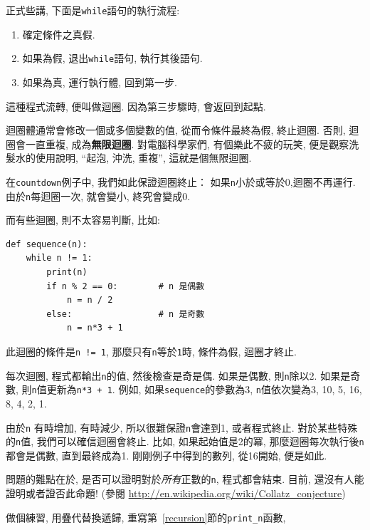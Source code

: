 \documentclass[10pt]{book}
\begin{document}
正式些講, 下面是{\tt while}語句的執行流程:

\begin{enumerate}

\item 確定條件之真假.

\item 如果為假, 退出{\tt while}語句, 執行其後語句. 

\item 如果為真, 運行執行體, 回到第一步. 

\end{enumerate}

這種程式流轉, 便叫做迴圈. 因為第三步驟時, 會返回到起點. 

迴圈體通常會修改一個或多個變數的值, 從而令條件最終為假, 終止迴圈. 
否則, 迴圈會一直重複, 成為{\bf 無限迴圈}. 
對電腦科學家們, 有個樂此不疲的玩笑, 
便是觀察洗髮水的使用說明, 
``起泡, 沖洗, 重複'',  這就是個無限迴圈. 

在{\tt countdown}例子中, 我們如此保證迴圈終止：
如果{\tt n}小於或等於0,迴圈不再運行. 
由於{\tt n}每迴圈一次, 就會變小, 終究會變成0.

而有些迴圈, 則不太容易判斷, 比如:

\begin{verbatim}
def sequence(n):
    while n != 1:
        print(n)
        if n % 2 == 0:        # n 是偶數
            n = n / 2
        else:                 # n 是奇數
            n = n*3 + 1
\end{verbatim}
%
此迴圈的條件是{\tt n != 1},  那麼只有{\tt n}等於{\tt 1}時, 條件為假, 迴圈才終止. 

每次迴圈, 程式都輸出{\tt n}的值, 然後檢查是奇是偶. 
如果是偶數, 則{\tt n}除以2. 如果是奇數, 則{\tt n}值更新為{\tt n*3 + 1}. 
例如, 如果{\tt sequence}的參數為3, {\tt n}值依次變為3, 10, 5, 16, 8, 4, 2, 1.


由於{\tt n} 有時增加, 有時減少, 所以很難保證{\tt n}會達到1, 或者程式終止. 
對於某些特殊的{\tt n}值, 我們可以確信迴圈會終止. 
比如, 如果起始值是2的冪, 那麼迴圈每次執行後{\tt n}都會是偶數, 直到最終成為1.
剛剛例子中得到的數列, 從16開始, 便是如此. 

問題的難點在於, 是否可以證明對於{\em 所有}正數的{\tt n}, 程式都會結束. 
目前, 還沒有人能證明或者證否此命題! 
(參閱 \url{http://en.wikipedia.org/wiki/Collatz_conjecture})

做個練習, 用疊代替換遞歸, 重寫第~\ref{recursion}節的\verb"print_n"函數, 
\end{document}
